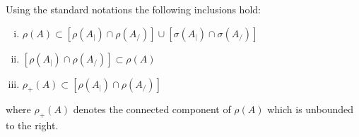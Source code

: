 \begin{proposition}\label{prop:a3-4.2}

Using the standard notations the following inclusions hold:
\begin{enumerate}[(i)]
\item 
$\rho(A) \subset [\rho(A_{|}) \cap \rho(A_{/})] \cup [\sigma(A_{|}) \cap \sigma(A_{/})]$

\item 
$[\rho(A_{|}) \cap \rho(A_{/})] \subset \rho(A) $

\item 
$\rho_{+}(A) \subset [\rho(A_{|}) \cap \rho(A_{/})]$
\end{enumerate}
 where $\rho_{+}(A)$ denotes the connected component of $\rho(A)$ which is unbounded to the right.

\end{proposition}

